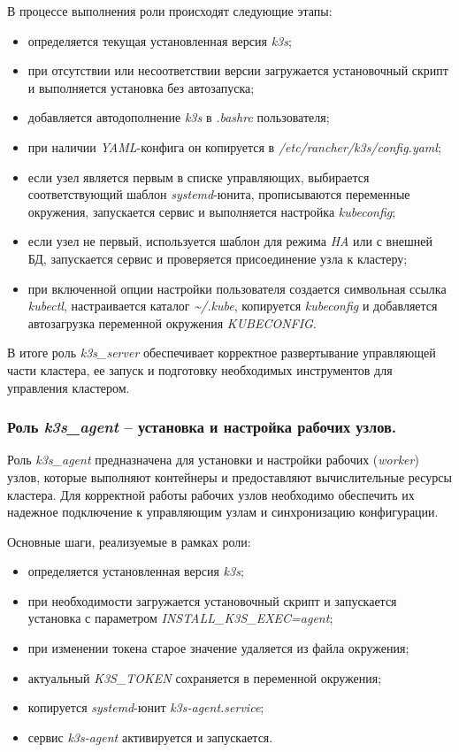 В процессе выполнения роли происходят следующие этапы:
\begin{itemize}
  \item определяется текущая установленная версия \textit{k3s};
  \item при отсутствии или несоответствии версии загружается установочный скрипт и выполняется установка без автозапуска;
  \item добавляется автодополнение \textit{k3s} в \textit{.bashrc} пользователя;
  \item при наличии \textit{YAML}-конфига он копируется в \textit{/etc/rancher/k3s/config.yaml};
  \item если узел является первым в списке управляющих, выбирается соответствующий шаблон \textit{systemd}-юнита, прописываются переменные окружения, запускается сервис и выполняется настройка \textit{kubeconfig};
  \item если узел не первый, используется шаблон для режима \textit{HA} или с внешней БД, запускается сервис и проверяется присоединение узла к кластеру;
  \item при включенной опции настройки пользователя создается символьная ссылка \textit{kubectl}, настраивается каталог \textit{\textasciitilde/.kube}, копируется \textit{kubeconfig} и добавляется автозагрузка переменной окружения \textit{KUBECONFIG}.
\end{itemize}

В итоге роль \textit{k3s\_server} обеспечивает корректное развертывание управляющей части кластера, ее запуск и подготовку необходимых инструментов для управления кластером.

\subsubsection{Роль \textit{k3s\_agent} -- установка и настройка рабочих узлов.}
Роль \textit{k3s\_agent} предназначена для установки и настройки рабочих (\textit{worker}) узлов, которые выполняют контейнеры и предоставляют вычислительные ресурсы кластера. Для корректной работы рабочих узлов необходимо обеспечить их надежное подключение к управляющим узлам и синхронизацию конфигурации.

Основные шаги, реализуемые в рамках роли:
\begin{itemize}
  \item определяется установленная версия \textit{k3s};
  \item при необходимости загружается установочный скрипт и запускается установка с параметром \textit{INSTALL\_K3S\_EXEC=agent};
  \item при изменении токена старое значение удаляется из файла окружения;
  \item актуальный \textit{K3S\_TOKEN} сохраняется в переменной окружения;
  \item копируется \textit{systemd}-юнит \textit{k3s-agent.service};
  \item сервис \textit{k3s-agent} активируется и запускается.
\end{itemize}

